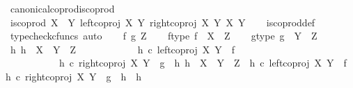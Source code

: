 \begin{isabellebody}
\isanewline
{}\isamarkupfalse%
\ canonical{\isacharunderscore}{\kern0pt}coprod{\isacharunderscore}{\kern0pt}is{\isacharunderscore}{\kern0pt}coprod{\isacharcolon}{\kern0pt}\isanewline
\ {\isachardoublequoteopen}is{\isacharunderscore}{\kern0pt}coprod\ {\isacharparenleft}{\kern0pt}X\ {\isasymCoprod}\ Y{\isacharparenright}{\kern0pt}\ {\isacharparenleft}{\kern0pt}left{\isacharunderscore}{\kern0pt}coproj\ X\ Y{\isacharparenright}{\kern0pt}\ {\isacharparenleft}{\kern0pt}right{\isacharunderscore}{\kern0pt}coproj\ X\ Y{\isacharparenright}{\kern0pt}\ X\ Y{\isachardoublequoteclose}\isanewline
%
\isadelimproof
\ \ %
\endisadelimproof
%
\isatagproof
{}\isamarkupfalse%
\ is{\isacharunderscore}{\kern0pt}coprod{\isacharunderscore}{\kern0pt}def\isanewline
{}\isamarkupfalse%
\ {\isacharparenleft}{\kern0pt}typecheck{\isacharunderscore}{\kern0pt}cfuncs{\isacharcomma}{\kern0pt}\ auto{\isacharparenright}{\kern0pt}\isanewline
\ \ \isamarkupfalse%
\ f\ g\ Z\isanewline
\ \ \isamarkupfalse%
\ f{\isacharunderscore}{\kern0pt}type{\isacharcolon}{\kern0pt}\ {\isachardoublequoteopen}f\ {\isacharcolon}{\kern0pt}\ X\ {\isasymrightarrow}\ Z{\isachardoublequoteclose}\isanewline
\ \ \isamarkupfalse%
\ g{\isacharunderscore}{\kern0pt}type{\isacharcolon}{\kern0pt}\ {\isachardoublequoteopen}g\ {\isacharcolon}{\kern0pt}\ Y\ {\isasymrightarrow}\ Z{\isachardoublequoteclose}\isanewline
\ \ \isamarkupfalse%
\ {\isachardoublequoteopen}{\isasymexists}h{\isachardot}{\kern0pt}\ h\ {\isacharcolon}{\kern0pt}\ X\ {\isasymCoprod}\ Y\ {\isasymrightarrow}\ Z\ {\isasymand}\isanewline
\ \ \ \ \ \ \ \ \ \ \ h\ {\isasymcirc}\isactrlsub c\ left{\isacharunderscore}{\kern0pt}coproj\ X\ Y\ {\isacharequal}{\kern0pt}\ f\ {\isasymand}\isanewline
\ \ \ \ \ \ \ \ \ \ \ h\ {\isasymcirc}\isactrlsub c\ right{\isacharunderscore}{\kern0pt}coproj\ X\ Y\ {\isacharequal}{\kern0pt}\ g\ {\isasymand}\ {\isacharparenleft}{\kern0pt}{\isasymforall}h{}{\isachardot}{\kern0pt}\ h{}\ {\isacharcolon}{\kern0pt}\ X\ {\isasymCoprod}\ Y\ {\isasymrightarrow}\ Z\ {\isasymand}\ h{}\ {\isasymcirc}\isactrlsub c\ left{\isacharunderscore}{\kern0pt}coproj\ X\ Y\ {\isacharequal}{\kern0pt}\ f\ {\isasymand}\ h{}\ {\isasymcirc}\isactrlsub c\ right{\isacharunderscore}{\kern0pt}coproj\ X\ Y\ {\isacharequal}{\kern0pt}\ g\ {\isasymlongrightarrow}\ h{}\ {\isacharequal}{\kern0pt}\ h{\isacharparenright}{\kern0pt}{\isachardoublequoteclose}\isanewline
\ \ \ \ \isamarkupfalse%

\end{isabellebody}

